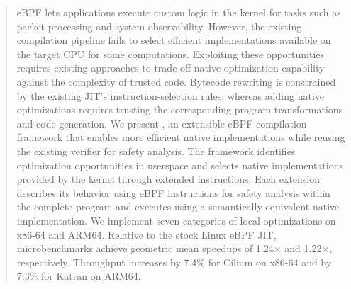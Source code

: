 \begin{abstract}
eBPF lets applications execute custom logic in the kernel for tasks such as packet processing and system observability. However, the existing compilation pipeline fails to select efficient implementations available on the target CPU for some computations. Exploiting these opportunities requires existing approaches to trade off native optimization capability against the complexity of trusted code. Bytecode rewriting is constrained by the existing JIT's instruction-selection rules, whereas adding native optimizations requires trusting the corresponding program transformations and code generation. We present \tool, an extensible eBPF compilation framework that enables more efficient native implementations while reusing the existing verifier for safety analysis. The framework identifies optimization opportunities in userspace and selects native implementations provided by the kernel through extended instructions. Each extension describes its behavior using eBPF instructions for safety analysis within the complete program and executes using a semantically equivalent native implementation. We implement seven categories of local optimizations on x86-64 and ARM64. Relative to the stock Linux eBPF JIT, microbenchmarks achieve geometric mean speedups of 1.24$\times$ and 1.22$\times$, respectively. Throughput increases by 7.4\% for Cilium on x86-64 and by 7.3\% for Katran on ARM64.
\end{abstract}
